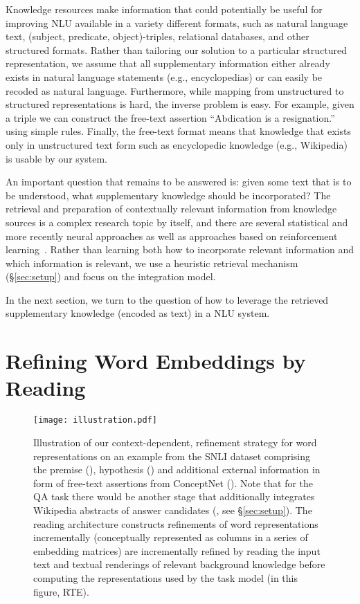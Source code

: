 \documentclass[11pt,a4paper]{article}
\begin{document}
Knowledge resources make information that could potentially be useful for improving NLU available in a variety different formats, such as natural language text, (subject, predicate, object)-triples, relational databases, and other structured formats. Rather than tailoring our solution to a particular structured representation, we assume that all supplementary information either already exists in natural language statements (e.g., encyclopedias) or can easily be recoded as natural language. Furthermore, while mapping from unstructured to structured representations is hard, the inverse problem is easy. For example, given a triple  we can construct the free-text assertion ``Abdication is a resignation.'' using simple rules. Finally, the free-text format means that knowledge that exists only in unstructured text form such as encyclopedic knowledge (e.g., Wikipedia) is usable by our system.

An important question that remains to be answered is: given some text that is to be understood, what supplementary knowledge should be incorporated? The retrieval and preparation of contextually relevant information from knowledge sources is a complex research topic by itself, and there are several statistical \citep{Manning:2008} and more recently neural approaches \citep{mitra2017neural} as well as approaches based on reinforcement learning~\citep{nogueira2017}. Rather than learning both how to incorporate relevant information and which information is relevant, we use a heuristic retrieval mechanism (\S\ref{sec:setup}) and focus on the integration model.

In the next section, we turn to the question of how to leverage the retrieved supplementary knowledge (encoded as text) in a NLU system.

\section{Refining Word Embeddings by Reading}\label{sec:reading_stage}

\begin{figure*}[ht!]
    \centering
    \texttt{[image: illustration.pdf]}
    \caption{Illustration of our context-dependent, refinement strategy for word representations on an example from the SNLI dataset comprising the premise (), hypothesis () and additional external information in form of free-text assertions from ConceptNet (). Note that for the QA task there would be another stage that additionally integrates Wikipedia abstracts of answer candidates (, see \S\ref{sec:setup}). The reading architecture constructs refinements of word representations incrementally (conceptually represented as columns in a series of embedding matrices)  are incrementally refined by reading the input text and textual renderings of relevant background knowledge before computing the representations used by the task model (in this figure, RTE).}
    \label{fig:illustration}
\end{figure*}
\end{document}
